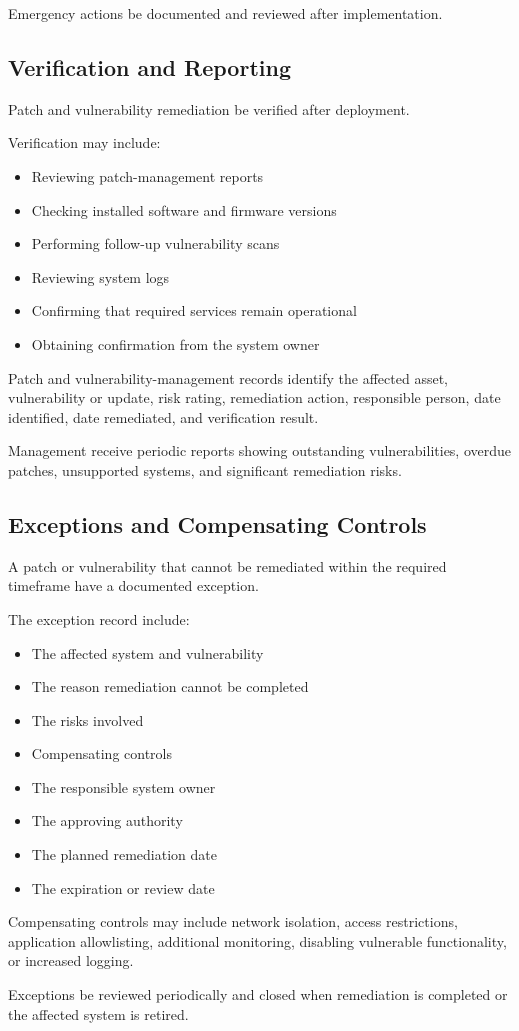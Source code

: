 Emergency actions \must{} be documented and reviewed after implementation.

\subsection{Verification and Reporting}

Patch and vulnerability remediation \must{} be verified after deployment.

Verification may include:
\begin{itemize}
    \item Reviewing patch-management reports
    \item Checking installed software and firmware versions
    \item Performing follow-up vulnerability scans
    \item Reviewing system logs
    \item Confirming that required services remain operational
    \item Obtaining confirmation from the system owner
\end{itemize}

Patch and vulnerability-management records \must{} identify the affected asset, vulnerability or update, risk rating, remediation action, responsible person, date identified, date remediated, and verification result.

Management \should{} receive periodic reports showing outstanding vulnerabilities, overdue patches, unsupported systems, and significant remediation risks.

\subsection{Exceptions and Compensating Controls}

A patch or vulnerability that cannot be remediated within the required timeframe \must{} have a documented exception.

The exception record \must{} include:
\begin{itemize}
    \item The affected system and vulnerability
    \item The reason remediation cannot be completed
    \item The risks involved
    \item Compensating controls
    \item The responsible system owner
    \item The approving authority
    \item The planned remediation date
    \item The expiration or review date
\end{itemize}

Compensating controls may include network isolation, access restrictions, application allowlisting, additional monitoring, disabling vulnerable functionality, or increased logging.

Exceptions \must{} be reviewed periodically and closed when remediation is completed or the affected system is retired.